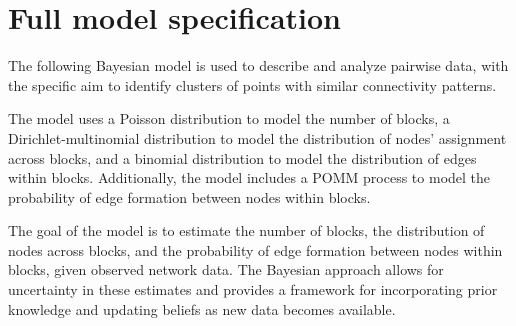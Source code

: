 \documentclass[11pt]{amsart}
\begin{document}
\begin{comment}
\begin{figure}[htbp]
    \centering
    \begin{minipage}{\textwidth}
        \centering
\texttt{[image: /Users/lapo\_santi/Desktop/Nial/project/POMMs/power-law prior/alpha1\_10.png]}
        \caption{alpha1\_10.png}
        \label{fig:boxplotnij}
    \end{minipage}\hfill
    \begin{minipage}{\textwidth}
        \centering
        \texttt{[image: /Users/lapo\_santi/Desktop/Nial/project/POMMs/power-law prior/alpha1.png]}
        \caption{alpha1.png}
        \label{fig:densityplotnij}
    \end{minipage}\hfill
    \vskip\floatsep
    \begin{minipage}{\textwidth}
        \centering
\texttt{[image: /Users/lapo\_santi/Desktop/Nial/project/POMMs/power-law prior/alpha1\_5.png]}
        \caption{alpha1\_5.png}
        \label{fig:boxplotyij}
    \end{minipage}
 \end{figure}

\end{comment}
\newpage



\section{Full model specification}

The following Bayesian model is used to describe and analyze pairwise data, with the specific aim to identify clusters of points with similar connectivity patterns. 

The model uses a Poisson distribution to model the number of blocks, a Dirichlet-multinomial distribution to model the distribution of nodes' assignment across blocks, and a binomial distribution to model the distribution of edges within blocks. Additionally, the model includes a POMM process to model the probability of edge formation between nodes within blocks.

The goal of the model is to estimate the number of blocks, the distribution of nodes across blocks, and the probability of edge formation between nodes within blocks, given observed network data. The Bayesian approach allows for uncertainty in these estimates and provides a framework for incorporating prior knowledge and updating beliefs as new data becomes available.
\end{document}
